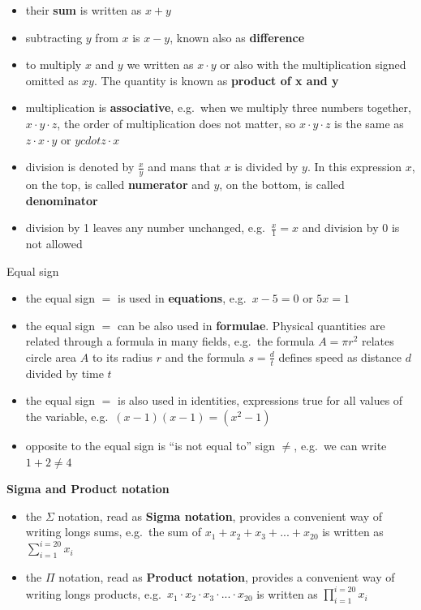 \documentclass[
]{book}
\providecommand{\tightlist}{%
  \setlength{\itemsep}{0pt}\setlength{\parskip}{0pt}}
\theoremstyle{definition}
\theoremstyle{definition}
\theoremstyle{definition}
\theoremstyle{remark}
\begin{document}
\begin{itemize}
\tightlist
\item
  their \textbf{sum} is written as \(x + y\)
\item
  subtracting \(y\) from \(x\) is \(x - y\), known also as \textbf{difference}
\item
  to multiply \(x\) and \(y\) we written as \(x \cdot y\) or also with the multiplication signed omitted as \(xy\). The quantity is known as \textbf{product of x and y}
\item
  multiplication is \textbf{associative}, e.g.~when we multiply three numbers together, \(x \cdot y \cdot z\), the order of multiplication does not matter, so \(x \cdot y \cdot z\) is the same as \(z \cdot x \cdot y\) or \(y cdot z \cdot x\)
\item
  division is denoted by \(\frac{x}{y}\) and mans that \(x\) is divided by \(y\). In this expression \(x\), on the top, is called \textbf{numerator} and \(y\), on the bottom, is called \textbf{denominator}
\item
  division by 1 leaves any number unchanged, e.g.~\(\frac{x}{1}=x\) and division by 0 is not allowed
\end{itemize}

Equal sign

\begin{itemize}
\tightlist
\item
  the equal sign \(=\) is used in \textbf{equations}, e.g.~\(x - 5 = 0\) or \(5x = 1\)
\item
  the equal sign \(=\) can be also used in \textbf{formulae}. Physical quantities are related through a formula in many fields, e.g.~the formula \(A=\pi r^2\) relates circle area \(A\) to its radius \(r\) and the formula \(s = \frac{d}{t}\) defines speed as distance \(d\) divided by time \(t\)
\item
  the equal sign \(=\) is also used in identities, expressions true for all values of the variable, e.g.~\((x-1)(x-1) = (x^2-1)\)
\item
  opposite to the equal sign is ``is not equal to'' sign \(\neq\), e.g.~we can write \(1+2 \neq 4\)
\end{itemize}

\textbf{Sigma and Product notation}

\begin{itemize}
\tightlist
\item
  the \(\Sigma\) notation, read as \textbf{Sigma notation}, provides a convenient way of writing longs sums, e.g.~the sum of \(x_1 + x_2 + x_3 + ... + x_{20}\) is written as \(\sum_{i=1}^{i=20}x_i\)
\item
  the \(\Pi\) notation, read as \textbf{Product notation}, provides a convenient way of writing longs products, e.g.~\(x_1 \cdot x_2 \cdot x_3 \cdot ... \cdot x_{20}\) is written as \(\prod_{i=1}^{i=20}x_i\)
\end{itemize}
\end{document}
